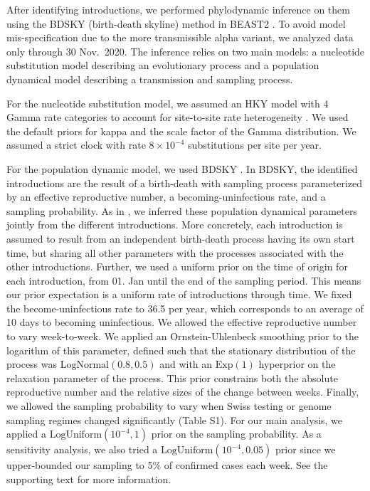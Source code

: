 \documentclass[11pt,twoside,lineno]{pnas-new} %
\begin{document}
After identifying introductions, we performed phylodynamic inference on them using the BDSKY (birth-death skyline) method \cite{stadler2013birth} in BEAST2 \cite{Bouckaert2019}. To avoid model mis-specification due to the more transmissible alpha variant, we analyzed data only through 30 Nov.~2020.  The inference relies on two main models: a nucleotide substitution model describing an evolutionary process and a population dynamical model describing a transmission and sampling process. 

For the nucleotide substitution model, we assumed an HKY \cite{Hasegawa1985} model with 4 Gamma rate categories to account for site-to-site rate heterogeneity \cite{Yang1994}. We used the default priors for kappa and the scale factor of the Gamma distribution. We assumed a strict clock with rate $8\times 10^{-4}$ substitutions per site per year.

For the population dynamic model, we used BDSKY \cite{stadler2013birth}. In BDSKY, the identified introductions are the result of a birth-death with sampling process parameterized by an effective reproductive number, a becoming-uninfectious rate, and a sampling probability. As in \cite{Muller2020}, we inferred these population dynamical parameters jointly from the different introductions. More concretely, each introduction is assumed to result from an independent birth-death process having its own start time, but sharing all other parameters with the processes associated with the other introductions. 
Further, we used a uniform prior on the time of origin for each introduction, from 01. Jan until the end of the sampling period. This means our prior expectation is a uniform rate of introductions through time. We fixed the become-uninfectious rate to 36.5 per year, which corresponds to an average of 10 days to becoming uninfectious. We allowed the effective reproductive number to vary week-to-week. We applied an Ornstein-Uhlenbeck smoothing prior to the logarithm of this parameter, defined such that the stationary distribution of the process was $\text{LogNormal}(0.8, 0.5)$  and with an $\text{Exp}(1)$ hyperprior on the relaxation parameter of the process. This prior constrains both the absolute reproductive number and the relative sizes of the change between weeks. Finally, we allowed the sampling probability to vary when Swiss testing or genome sampling regimes changed significantly (Table S1). For our main analysis, we applied a $\text{LogUniform}(10^{-4}, 1)$ prior on the sampling probability. As a sensitivity analysis, we also tried a $\text{LogUniform}(10^{-4}, 0.05)$ prior since we upper-bounded our sampling to 5\% of confirmed cases each week. See the supporting text for more information.
\end{document}
